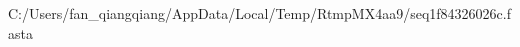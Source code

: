 \documentclass[10pt]{article}
\begin{document}
\begin{texshade}{C:/Users/fan_qiangqiang/AppData/Local/Temp/RtmpMX4aa9/seq1f84326026c.fasta}
\hidelogoscale
{}
\end{texshade}
\end{document}
